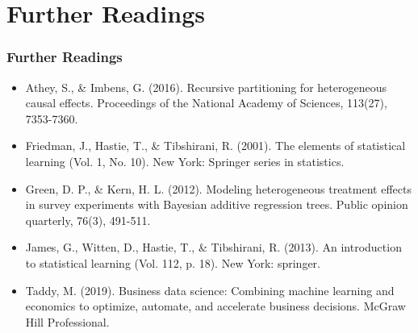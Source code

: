 \documentclass[
  shownotes,
  xcolor={svgnames},
  hyperref={colorlinks,citecolor=DarkBlue,linkcolor=DarkRed,urlcolor=DarkBlue}
  , aspectratio=169]{beamer}
\begin{document}
\section{Further Readings}
\begin{frame}
\frametitle{Further Readings}

\begin{itemize}



  \item Athey, S., \& Imbens, G. (2016). Recursive partitioning for heterogeneous causal effects. Proceedings of the National Academy of Sciences, 113(27), 7353-7360.
  \medskip
  \item Friedman, J., Hastie, T., \& Tibshirani, R. (2001). The elements of statistical learning (Vol. 1, No. 10). New York: Springer series in statistics.
  \medskip
  \item Green, D. P., \& Kern, H. L. (2012). Modeling heterogeneous treatment effects in survey experiments with Bayesian additive regression trees. Public opinion quarterly, 76(3), 491-511.
  \medskip
  \item James, G., Witten, D., Hastie, T., \& Tibshirani, R. (2013). An introduction to statistical learning (Vol. 112, p. 18). New York: springer.
  \medskip
  \item Taddy, M. (2019). Business data science: Combining machine learning and economics to optimize, automate, and accelerate business decisions. McGraw Hill Professional.
  
  
\end{itemize}

\end{frame}





\end{document}
